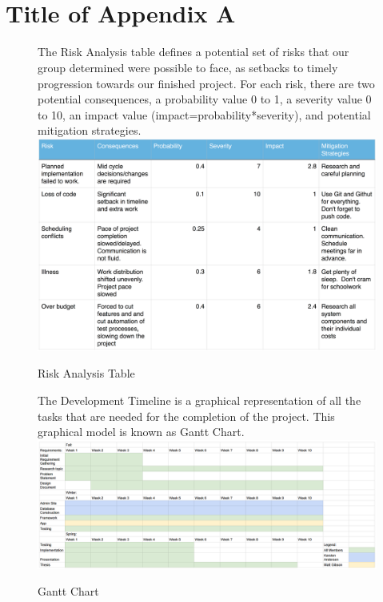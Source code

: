\appendix
\section{\\Title of Appendix A}

\begin{figure}
The Risk Analysis table defines a potential set of risks that our group determined were possible to face, as setbacks to timely progression towards our finished project. For each risk, there are two potential consequences, a probability value 0 to 1, a severity value 0 to 10, an impact value (impact=probability*severity), and potential mitigation strategies.
\newline
\includegraphics[width=1\textwidth]{images/risk.png}
\caption{Risk Analysis Table}
\end{figure}

\begin{figure}
The Development Timeline is a graphical representation of all the tasks that are needed for the completion of the project. This graphical model is known as Gantt Chart.
\newline
\includegraphics[width=1\textwidth]{images/gantt.png}
\caption{Gantt Chart}
\end{figure}

